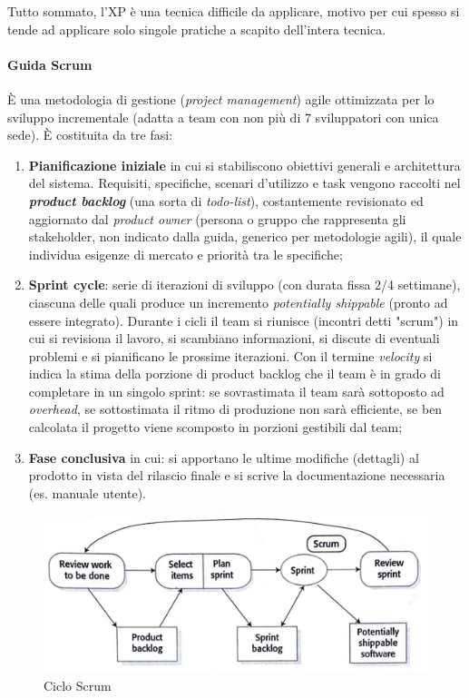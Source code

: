 Tutto sommato, l'XP è una tecnica difficile da applicare, motivo per cui spesso si tende ad applicare solo singole pratiche a scapito dell'intera tecnica.

\paragraph{Guida Scrum} È una metodologia di gestione (\textit{project management}) agile ottimizzata per lo sviluppo incrementale (adatta a team con non più di 7 sviluppatori con unica sede). È costituita da tre fasi:
\begin{enumerate}
    \item \textbf{Pianificazione iniziale} in cui si stabiliscono obiettivi generali e architettura del sistema. Requisiti, specifiche, scenari d'utilizzo e task vengono raccolti nel \textbf{\textit{product backlog}} (una sorta di \textit{todo-list}), costantemente revisionato ed aggiornato dal \textit{product owner} (persona o gruppo che rappresenta gli stakeholder, non indicato dalla guida, generico per metodologie agili), il quale individua esigenze di mercato e priorità tra le specifiche;
    \item \textbf{Sprint cycle}: serie di iterazioni di sviluppo (con durata fissa 2/4 settimane), ciascuna delle quali produce un incremento \textit{potentially shippable} (pronto ad essere integrato). Durante i cicli il team si riunisce (incontri detti "scrum") in cui si revisiona il lavoro, si scambiano informazioni, si discute di eventuali problemi e si pianificano le prossime iterazioni. Con il termine \textit{velocity} si indica la stima della porzione di product backlog che il team è in grado di completare in un singolo sprint: se sovrastimata il team sarà sottoposto ad  \textit{overhead}, se sottostimata il ritmo di produzione non sarà efficiente, se ben calcolata il progetto viene scomposto in porzioni gestibili dal team;
    \item \textbf{Fase conclusiva} in cui: si apportano le ultime modifiche (dettagli) al prodotto in vista del rilascio finale e si scrive la documentazione necessaria (es. manuale utente).
\end{enumerate}

\begin{figure}[h!]
    \centering
    \includegraphics[width=0.75\linewidth]{assets/sprint-cycle.png}
    \caption{Ciclo Scrum}
    \label{fig:sprint-cycle}
\end{figure}

